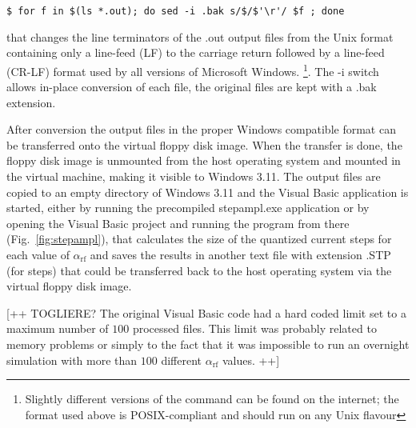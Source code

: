 \begin{lstlisting}
$ for f in $(ls *.out); do sed -i .bak s/$/$'\r'/ $f ; done
\end{lstlisting}

that changes the line terminators of the \textsf{.out} output files from the Unix format containing only a line-feed (LF) to the carriage return followed by a line-feed (CR-LF) format used by all versions of Microsoft Windows. 
\footnote{Slightly different versions of the command can be found on the internet; the format used above is POSIX-compliant and should run on any Unix flavour}.
The \textsf{-i} switch allows in-place conversion of each file, the original files are kept with a \textsf{.bak} extension.

After conversion the output files in the proper Windows compatible format can be transferred onto the virtual floppy disk image. %
When the transfer is done, the floppy disk image is unmounted from the host operating system and mounted  in the virtual machine, making it visible to Windows 3.11. 
The output files are copied to an empty directory of Windows 3.11 and the Visual Basic application is started, either by running the precompiled \textsf{stepampl.exe} application or by opening the Visual Basic project and running the program from there (Fig.~\ref{fig:stepampl}), that calculates the size of the quantized current steps for each value of $\alpha_\mathrm{rf}$ and saves the results in another text file with extension \textsf{.STP} (for steps) that could be transferred back to the host operating system via the virtual floppy disk image.

[++ TOGLIERE? The original Visual Basic code had a hard coded limit set to a maximum number of $100$ processed files. This limit was probably related to memory problems or simply to the fact that it was impossible to run an overnight simulation with more than $100$ different $\alpha_\mathrm{rf}$ values. ++]

